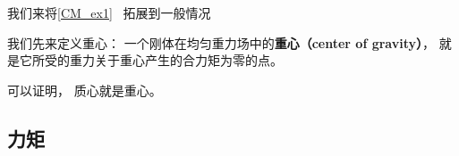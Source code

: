 
\begin{issues}
\issueDraft
\end{issues}


我们来将\autoref{CM_ex1}~ 拓展到一般情况

我们先来定义重心： 一个刚体在均匀重力场中的\textbf{重心（center of gravity）}， 就是它所受的重力关于重心产生的合力矩为零的点。

可以证明， 质心就是重心。

\subsection{力矩}
